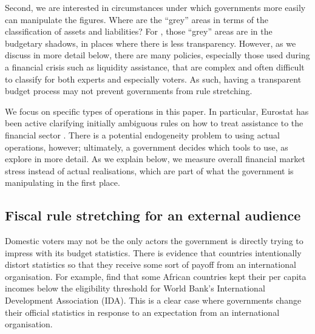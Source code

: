 \documentclass[]{article}
\begin{document}
Second, we are interested in circumstances under which governments more easily can manipulate the figures. Where are the ``grey'' areas in terms of the classification of assets and liabilities? For \cite{Alt2014}, those ``grey'' areas are in the budgetary shadows, in places where there is less transparency. However, as we discuss in more detail below, there are many policies, especially those used during a financial crisis such as liquidity assistance, that are complex and often difficult to classify for both experts and especially voters. As such, having a transparent budget process may not prevent governments from rule stretching.

We focus on specific types of operations in this paper. In particular, Eurostat has been active clarifying initially ambiguous rules on how to treat assistance to the financial sector \cite[see][]{GandrudHallerberg2016}. There is a potential endogeneity problem to using actual operations, however; ultimately, a government decides which tools to use, as \cite{GandrudHallerberg2016} explore in more detail. As we explain below, we measure overall financial market stress instead of actual realisations, which are part of what the government is manipulating in the first place.

\subsection{Fiscal rule stretching for an external audience}

Domestic voters may not be the only actors the government is directly trying to impress with its budget statistics. There is evidence that countries intentionally distort statistics so that they receive some sort of payoff from an international organisation. For example, \cite{kerner2016} find that some African countries kept their per capita incomes below the eligibility threshold for World Bank’s International Development Association (IDA). This is a clear case where governments change their official statistics in response to an expectation from an international organisation.
\end{document}
